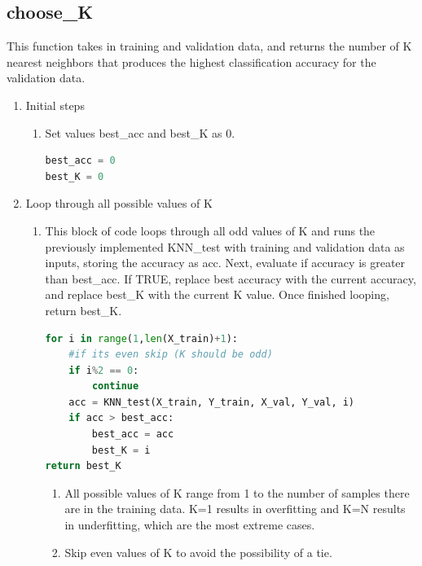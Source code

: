 \documentclass[11pt]{article}
\theoremstyle{definition}
\begin{document}
\subsection{choose\_K}
This function takes in training and validation data, and returns the number of \textsf{K} nearest neighbors that produces the highest classification accuracy for the validation data.
\begin{enumerate}
    \item Initial steps
    \begin{enumerate}
        \item Set values \textsf{best\_acc} and \textsf{best\_K} as 0.
\begin{lstlisting}[language=python, frame=single]
best_acc = 0
best_K = 0
\end{lstlisting}
    \end{enumerate}
    \item Loop through all possible values of \textsf{K}
    \begin{enumerate}
        \item This block of code loops through all odd values of \textsf{K} and runs the previously implemented \textsf{KNN\_test} with training and validation data as inputs, storing the accuracy as \textsf{acc}. Next, evaluate if accuracy is greater than \textsf{best\_acc}. If TRUE, replace best accuracy with the current accuracy, and replace \textsf{best\_K} with the current \textsf{K} value. Once finished looping, return \textsf{best\_K}.
\begin{lstlisting}[language=python, frame=single]
for i in range(1,len(X_train)+1):
    #if its even skip (K should be odd)
    if i%2 == 0:
        continue
    acc = KNN_test(X_train, Y_train, X_val, Y_val, i)
    if acc > best_acc:
        best_acc = acc
        best_K = i
return best_K
\end{lstlisting}
        \begin{enumerate}
            \item All possible values of \textsf{K} range from 1 to the number of samples there are in the training data. \textsf{K=1} results in overfitting and \textsf{K=N} results in underfitting, which are the most extreme cases.
            \item Skip even values of \textsf{K} to avoid the possibility of a tie.
        \end{enumerate}
    \end{enumerate}
\end{enumerate}
\end{document}
